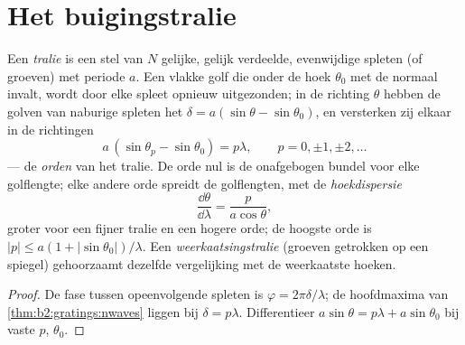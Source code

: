 \section{Het buigingstralie}

\begin{proposition}[Tralievergelijking]\label{prop:b2:gratings:equation}
Een \emph{tralie} is een stel van $N$ gelijke, gelijk verdeelde, evenwijdige spleten
(of groeven) met periode $a$. Een vlakke golf die onder de hoek $\theta_0$
met de normaal invalt, wordt door elke spleet opnieuw uitgezonden; in de
richting $\theta$ hebben
de golven van naburige spleten het 
$\delta = a(\sin\theta
- \sin\theta_0)$, en versterken zij elkaar in de
richtingen
\[
a\,(\sin\theta_p - \sin\theta_0) = p\lambda , \qquad p = 0, \pm1, \pm2, \dots
\]
--- de \emph{orden} van het tralie. De orde nul is de onafgebogen
bundel voor elke golflengte; elke andere orde spreidt de golflengten,
met de \emph{hoekdispersie}
\[
\frac{\dd\theta}{\dd\lambda} = \frac{p}{a\cos\theta} ,
\]
groter voor een fijner tralie en een hogere orde; de hoogste orde is
$|p| \le a(1 + |\sin\theta_0|)/\lambda$. Een \emph{weerkaatsingstralie}
(groeven getrokken
op een spiegel) gehoorzaamt dezelfde vergelijking met de weerkaatste hoeken.
\end{proposition}

\begin{proof}
De fase tussen opeenvolgende spleten is $\varphi = 2\pi\delta/\lambda$; de
hoofdmaxima
van \cref{thm:b2:gratings:nwaves} liggen bij $\delta = p\lambda$.
Differentieer $a\sin\theta = p\lambda + a\sin\theta_0$ bij vaste $p$, $\theta_0$.
\end{proof}

